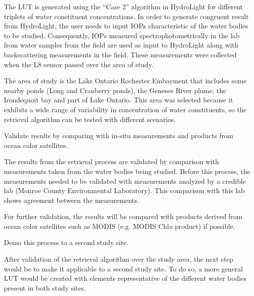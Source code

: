 \begin{enumerate}
The LUT is generated using the ``Case 2''  algorithm in HydroLight for different triplets of water constituent concentrations. In order to generate congruent result from HydroLight, the user needs to input IOPs characteristic of the water bodies to be studied. Consequently, IOPs measured spectrophotometrically in the lab from water samples from the field are used as input to HydroLight along with backscattering measurements in the field. These measurements were collected when the L8 sensor passed over the area of study.

The area of study is the Lake Ontario Rochester Embayment that includes some nearby ponds (Long and Cranberry ponds), the Genesee River plume, the Irondequoit bay and part of Lake Ontario. This area was selected because it exhibits a wide range of variability in concentration of water constituents, so the retrieval algorithm can be tested with different scenarios.
 
	{\bf \item Validate results by comparing with in-situ measurements and products from ocean color satellites.}

The results from the retrieval process are validated by comparison with measurements taken from the water bodies being studied. Before this process, the measurements needed to be validated with measurements analyzed by a credible lab (Monroe County Environmental Laboratory). This comparison with this lab shows agreement between the measurements. 

For further validation, the results will be compared with products derived from ocean color satellites such as MODIS (e.g. MODIS Chl{\it a} product) if possible.

	{\bf \item { Demo this process to a second study site}.}

After validation of the retrieval algorithm over the study area, the next step would be to make it applicable to a second study site. To do so, a more general LUT would be created with elements representative of the different water bodies present in both study sites.


\end{enumerate}


